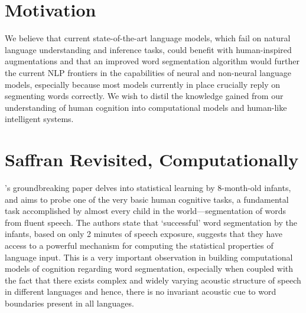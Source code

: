 \documentclass{article}
\begin{document}
\section{Motivation}
We believe that
current state-of-the-art language models, which fail on natural language understanding and inference tasks, could benefit with human-inspired augmentations and that an improved word segmentation algorithm would further the current NLP frontiers in the capabilities of neural and non-neural language models, especially because most models currently in place crucially reply on segmenting words correctly. We wish to distil the knowledge gained from our understanding of human cognition into computational models and human-like intelligent systems.




\section{Saffran Revisited, Computationally}
\citet{Saffran1996}'s groundbreaking paper delves into statistical learning by 8-month-old infants, and aims to probe one of the very basic human cognitive tasks, a fundamental task accomplished by almost every child in the world---segmentation of words from fluent speech. The authors state that `successful' word segmentation by the infants, based on only 2 minutes of speech exposure, suggests that they have access to a powerful mechanism for computing the statistical properties of language input. This is a very important observation in building computational models of cognition regarding word segmentation, especially when coupled with the fact that there exists complex and widely varying acoustic structure of speech in different languages and hence, there is no invariant acoustic cue to word boundaries present in all languages.
\end{document}
